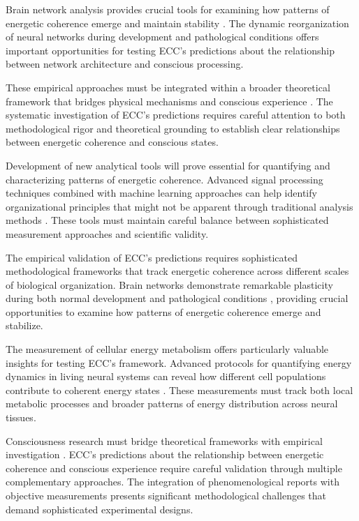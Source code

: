 \begin{refsection}
Brain network analysis provides crucial tools for examining how patterns of energetic coherence emerge and maintain stability \cite{DePasquale2020}. The dynamic reorganization of neural networks during development and pathological conditions offers important opportunities for testing ECC's predictions about the relationship between network architecture and conscious processing.

These empirical approaches must be integrated within a broader theoretical framework that bridges physical mechanisms and conscious experience \cite{Northoff2020}. The systematic investigation of ECC's predictions requires careful attention to both methodological rigor and theoretical grounding to establish clear relationships between energetic coherence and conscious states.

Development of new analytical tools will prove essential for quantifying and characterizing patterns of energetic coherence. Advanced signal processing techniques combined with machine learning approaches can help identify organizational principles that might not be apparent through traditional analysis methods \cite{Buzsaki2019}. These tools must maintain careful balance between sophisticated measurement approaches and scientific validity.

The empirical validation of ECC's predictions requires sophisticated methodological frameworks that track energetic coherence across different scales of biological organization. Brain networks demonstrate remarkable plasticity during both normal development and pathological conditions \cite{Vertes2015}, providing crucial opportunities to examine how patterns of energetic coherence emerge and stabilize.

The measurement of cellular energy metabolism offers particularly valuable insights for testing ECC's framework. Advanced protocols for quantifying energy dynamics in living neural systems can reveal how different cell populations contribute to coherent energy states \cite{Zhang2019}. These measurements must track both local metabolic processes and broader patterns of energy distribution across neural tissues.

Consciousness research must bridge theoretical frameworks with empirical investigation \cite{Tononi2015}. ECC's predictions about the relationship between energetic coherence and conscious experience require careful validation through multiple complementary approaches. The integration of phenomenological reports with objective measurements presents significant methodological challenges that demand sophisticated experimental designs.


\end{refsection}
